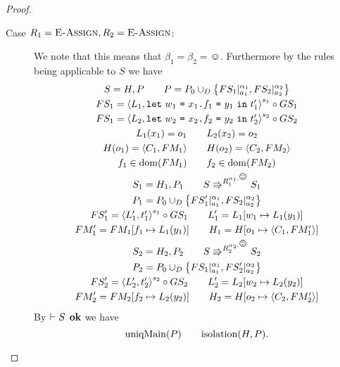 \begin{proof}
  \begin{description}
    \item[Case $R_1 = \mbox{{\sc E-Assign}}, R_2 = \mbox{{\sc E-Assign}}$:] We note that this means that
      $\beta_1 = \beta_2 = \smiley$. Furthermore by the rules being applicable
      to $S$ we have
      \begin{equation}
        \begin{gathered}
          S = H, P \andalso P = P_0 \cup_D \left\{ FS_1|_{a_1}^{\alpha_1},
          FS_2|_{a_2}^{\alpha_2} \right\} \\
          FS_1 = \xframe{L_1, \Let{w_1}{\FAss{x_1}{f_1}{y_1}}{t'_1}}^{s_1} \circ GS_1
          \\ 
          FS_1 = \xframe{L_2, \Let{w_2}{\FAss{x_2}{f_2}{y_2}}{t'_2}}^{s_2}
          \circ GS_2 \\
          L_1(x_1) = o_1 \andalso L_2(x_2) = o_2 \\
          H(o_1) = \Obj{C_1, FM_1} \andalso H(o_2) = \Obj{C_2, FM_2} \\
          f_1 \in \dom(FM_1) \andalso f_2 \in \dom(FM_2) \\
          S_1 = H_1, P_1 \andalso S \Rrightarrow^{R_1^{\alpha_1, \smiley}} S_1
          \\
          P_1 = P_0 \cup_D \left\{ FS'_1|_{a_1}^{\alpha_1},
          FS_2|_{a_2}^{\alpha_2} \right\} \\
          FS'_1 = \xframe{L'_1, t'_1}^{s_1} \circ GS_1  \andalso L'_1 = L_1[w_1 \mapsto
          L_1(y_1)] \\
          FM'_1 = FM_1[f_1 \mapsto L_1(y_1)] \andalso H_1 = H[o_1 \mapsto
          \Obj{C_1, FM'_1}]
          \\
          S_2 = H_2, P_2 \andalso S \Rrightarrow^{R_2^{\alpha_2, \smiley}} S_2
          \\
          P_2 = P_0 \cup_D \left\{ FS_1|_{a_1}^{\alpha_1},
          FS'_2|_{a_2}^{\alpha_2} \right\} \\
          FS'_2 = \xframe{L'_2, t'_2}^{s_2} \circ GS_2  \andalso L'_2 = L_2[w_2 \mapsto
          L_2(y_2)] \\
          FM'_2 = FM_2[f_2 \mapsto L_2(y_2)] \andalso H_2 = H[o_2 \mapsto
          \Obj{C_2, FM'_2}]
          \\
        \end{gathered}
      \end{equation}
      By $\vdash S \:\: \mbox{\bf ok}$ we have
      \begin{equation}
        \mbox{$\mathrm{uniqMain}$}(P) \quad\quad \mbox{$\mathrm{isolation}$}(H, P).
      \end{equation}

\end{description}
\end{proof}
